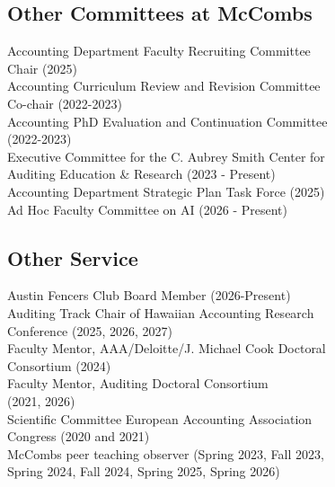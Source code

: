 \documentclass[]{deedy-resume-openfont}
\begin{document}
\begin{minipage}[t]{0.49\textwidth} 




\subsection{Other Committees at McCombs}
Accounting Department Faculty Recruiting Committee \\
\hspace*{.4cm} Chair (2025) \\
Accounting Curriculum Review and Revision Committee \\ 
\hspace*{.4cm} Co-chair (2022-2023)\\
Accounting PhD Evaluation and Continuation Committee \\ 
\hspace*{.4cm} (2022-2023)\\
Executive Committee for the C. Aubrey Smith Center
for \\
\hspace*{.4cm} Auditing Education \& Research (2023 - Present) \\
Accounting Department Strategic Plan Task Force (2025) \\
Ad Hoc Faculty Committee on AI (2026 - Present)
\sectionsep

\subsection{Other Service}
Austin Fencers Club Board Member (2026-Present) \\
Auditing Track Chair of Hawaiian Accounting Research \\ \hspace*{.4cm} Conference (2025, 2026, 2027) \\ 
Faculty Mentor, AAA/Deloitte/J. Michael Cook Doctoral \\ \hspace*{.4cm} Consortium (2024) \\
Faculty Mentor, Auditing Doctoral Consortium \\ \hspace*{.4cm}(2021, 2026) \\
Scientific Committee European Accounting Association \\ 
\hspace*{.4cm} Congress (2020 and 2021) \\
McCombs peer teaching observer (Spring 2023, Fall 2023,  \\ 
\hspace*{.4cm} Spring 2024, Fall 2024, Spring 2025, Spring 2026)



\sectionsep

\end{minipage}
\end{document}
